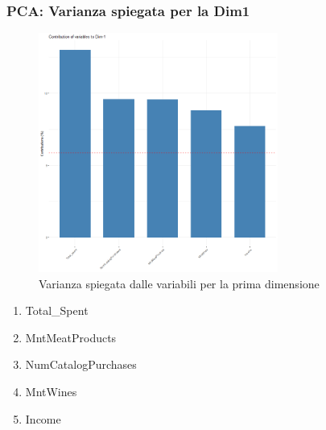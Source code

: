 \begin{frame}[fragile]
\frametitle{PCA: Varianza spiegata per la Dim1}
\begin{minipage}{0.45\textwidth}
\begin{figure}[H]
    \centering
    \includegraphics[width=0.7\textwidth]{Img/PCA002.png}
    \caption{Varianza spiegata dalle variabili per la prima dimensione}
    \label{fig:fviz_contrib(pca, choice = "var", axes = 1, top = 5)}
\end{figure}
\end{minipage}%
\hspace{3em}
\begin{minipage}{0.45\textwidth}
\begin{enumerate}
    \item Total\_Spent
    \item MntMeatProducts
    \item NumCatalogPurchases
    \item MntWines 
    \item Income
\end{enumerate}
\end{minipage}%
\end{frame}


